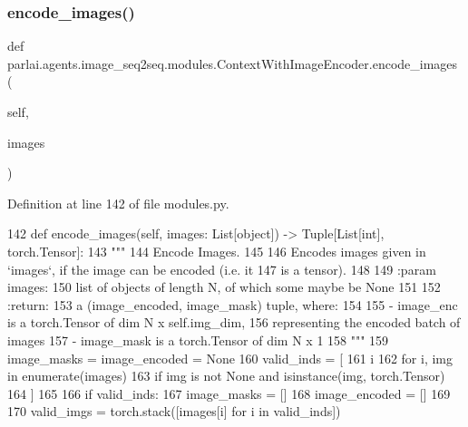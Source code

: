 \subsubsection{\texorpdfstring{encode\+\_\+images()}{encode\_images()}}
{\footnotesize\ttfamily def parlai.\+agents.\+image\+\_\+seq2seq.\+modules.\+Context\+With\+Image\+Encoder.\+encode\+\_\+images (\begin{DoxyParamCaption}\item[{}]{self,  }\item[{}]{images }\end{DoxyParamCaption})}



Definition at line 142 of file modules.\+py.


\begin{DoxyCode}
142     \textcolor{keyword}{def }encode\_images(self, images: List[object]) -> Tuple[List[int], torch.Tensor]:
143         \textcolor{stringliteral}{"""}
144 \textcolor{stringliteral}{        Encode Images.}
145 \textcolor{stringliteral}{}
146 \textcolor{stringliteral}{        Encodes images given in `images`, if the image can be encoded (i.e. it}
147 \textcolor{stringliteral}{        is a tensor).}
148 \textcolor{stringliteral}{}
149 \textcolor{stringliteral}{        :param images:}
150 \textcolor{stringliteral}{            list of objects of length N, of which some maybe be None}
151 \textcolor{stringliteral}{}
152 \textcolor{stringliteral}{        :return:}
153 \textcolor{stringliteral}{            a (image\_encoded, image\_mask) tuple, where:}
154 \textcolor{stringliteral}{}
155 \textcolor{stringliteral}{            - image\_enc is a torch.Tensor of dim N x self.img\_dim,}
156 \textcolor{stringliteral}{              representing the encoded batch of images}
157 \textcolor{stringliteral}{            - image\_mask is a torch.Tensor of dim N x 1}
158 \textcolor{stringliteral}{        """}
159         image\_masks = image\_encoded = \textcolor{keywordtype}{None}
160         valid\_inds = [
161             i
162             \textcolor{keywordflow}{for} i, img \textcolor{keywordflow}{in} enumerate(images)
163             \textcolor{keywordflow}{if} img \textcolor{keywordflow}{is} \textcolor{keywordflow}{not} \textcolor{keywordtype}{None} \textcolor{keywordflow}{and} isinstance(img, torch.Tensor)
164         ]
165 
166         \textcolor{keywordflow}{if} valid\_inds:
167             image\_masks = []
168             image\_encoded = []
169 
170             valid\_imgs = torch.stack([images[i] \textcolor{keywordflow}{for} i \textcolor{keywordflow}{in} valid\_inds])

\end{DoxyCode}
